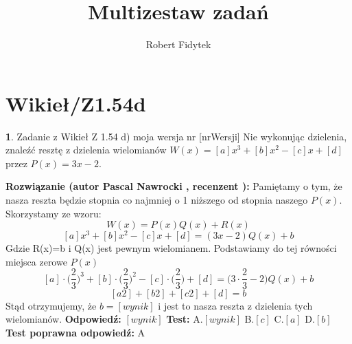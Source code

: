 \documentclass[12pt, a4paper]{article}
\title{Multizestaw zadań}
\author{Robert Fidytek}
\date{}
\theoremstyle{definition} %
\newtheorem{zad}{}
\newcommand{\kategoria}[1]{\section{#1}} %
\newcommand{\zadStart}[1]{\begin{zad}#1\newline} %
\newcommand{\zadStop}{\end{zad}}   %
\newcommand{\rozwStart}[2]{\noindent \textbf{Rozwiązanie (autor #1 , recenzent #2): }\newline} %
\newcommand{\odpStart}{\noindent \textbf{Odpowiedź:}\newline}    %
\newcommand{\odpStop}{\newline}                                             %
\newcommand{\testStart}{\noindent \textbf{Test:}\newline} %
\newcommand{\testStop}{\newline} %
\newcommand{\kluczStart}{\noindent \textbf{Test poprawna odpowiedź:}\newline} %
\newcommand{\kluczStop}{\newline} %
\begin{document}
\maketitle
\kategoria{Wikieł/Z1.54d}
\zadStart{Zadanie z Wikieł Z 1.54 d) moja wersja nr [nrWersji]}
Nie wykonując dzielenia, znaleźć resztę z dzielenia wielomianów $W(x)=[a]x^3+[b]x^2-[c]x+[d]$ przez $P(x)=3x-2$.
\zadStop
\rozwStart{Pascal Nawrocki}{}
Pamiętamy o tym, że nasza reszta będzie stopnia co najmniej o 1 niższego od stopnia naszego $P(x)$. Skorzystamy ze wzoru:
$$W(x)=P(x)Q(x)+R(x)$$
$$[a]x^3+[b]x^2-[c]x+[d]=(3x-2)Q(x)+b$$
Gdzie R(x)=b i Q(x) jest pewnym wielomianem. Podstawiamy do tej równości miejsca zerowe $P(x)$
$$[a]\cdot\big(\frac{2}{3}\big)^3+[b]\cdot\big(\frac{2}{3}\big)^2-[c]\cdot\big(\frac{2}{3}\big)+[d]=\big(3\cdot\frac{2}{3}-2\big)Q(x)+b$$
$$[a2]+[b2]+[c2]+[d]=b$$
Stąd otrzymujemy, że $b=[wynik]$ i jest to nasza reszta z dzielenia tych wielomianów.
\odpStart
$[wynik]$
\odpStop
\testStart
A.$[wynik]$
B.$[c]$
C.$[a]$
D.$[b]$
\testStop
\kluczStart
A
\kluczStop
\end{document}

